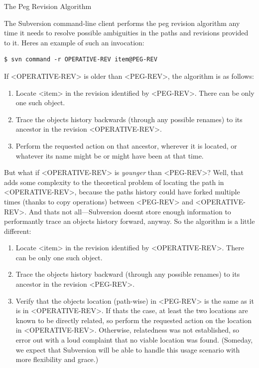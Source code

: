 \protect{}\label{svn.advanced.pegrevs.algorithm}
The Peg Revision Algorithm

The Subversion command-line client performs the peg revision algorithm
any time it needs to resolve possible ambiguities in the paths and
revisions provided to it. Here\textquotesingle s an example of such an
invocation:

\begin{verbatim}
$ svn command -r OPERATIVE-REV item@PEG-REV
\end{verbatim}

If \textless OPERATIVE-REV\textgreater{} is older than
\textless PEG-REV\textgreater, the algorithm is as follows:

\begin{enumerate}
\def\labelenumi{\arabic{enumi}.}
\item
  Locate \textless item\textgreater{} in the revision identified by
  \textless PEG-REV\textgreater. There can be only one such object.
\item
  Trace the object\textquotesingle s history backwards (through any
  possible renames) to its ancestor in the revision
  \textless OPERATIVE-REV\textgreater.
\item
  Perform the requested action on that ancestor, wherever it is located,
  or whatever its name might be or might have been at that time.
\end{enumerate}

But what if \textless OPERATIVE-REV\textgreater{} is \emph{younger} than
\textless PEG-REV\textgreater? Well, that adds some complexity to the
theoretical problem of locating the path in
\textless OPERATIVE-REV\textgreater, because the path\textquotesingle s
history could have forked multiple times (thanks to copy operations)
between \textless PEG-REV\textgreater{} and
\textless OPERATIVE-REV\textgreater. And that\textquotesingle s not
all---Subversion doesn\textquotesingle t store enough information to
performantly trace an object\textquotesingle s history forward, anyway.
So the algorithm is a little different:

\begin{enumerate}
\def\labelenumi{\arabic{enumi}.}
\item
  Locate \textless item\textgreater{} in the revision identified by
  \textless OPERATIVE-REV\textgreater. There can be only one such
  object.
\item
  Trace the object\textquotesingle s history backward (through any
  possible renames) to its ancestor in the revision
  \textless PEG-REV\textgreater.
\item
  Verify that the object\textquotesingle s location (path-wise) in
  \textless PEG-REV\textgreater{} is the same as it is in
  \textless OPERATIVE-REV\textgreater. If that\textquotesingle s the
  case, at least the two locations are known to be directly related, so
  perform the requested action on the location in
  \textless OPERATIVE-REV\textgreater. Otherwise, relatedness was not
  established, so error out with a loud complaint that no viable
  location was found. (Someday, we expect that Subversion will be able
  to handle this usage scenario with more flexibility and grace.)
\end{enumerate}

